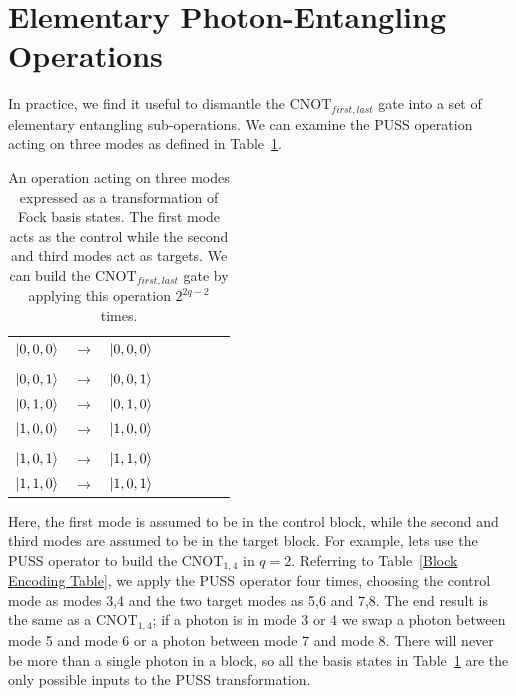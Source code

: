 \documentclass[aps,pra,twocolumn,showpacs,superscriptaddress,floatfix,10pt]{revtex4}
\begin{document}
\section{Elementary Photon-Entangling Operations}
\label{Section Elementary Photon Entangling Operations}

 In practice, we find it useful to dismantle the $\mbox{CNOT}_{first,last}$ gate into a set of elementary entangling sub-operations. We can examine the PUSS operation acting on three modes as defined in Table~\ref{One Control Two Targets}. 
\begin {table}[h]
\begin{center}
	\begin{tabular}{l*{6}{c}r} 
		$\ket{0,0,0}$  &  $\rightarrow$ & $\ket{0,0,0}$ \\ \\
		$\ket{0,0,1}$  & $\rightarrow$ & $\ket{0,0,1}$ \\
		$\ket{0,1,0}$ & $\rightarrow$ & $\ket{0,1,0}$ \\
		$\ket{1,0,0}$ & $\rightarrow$ & $\ket{1,0,0} $ \\ \\
		$\ket{1,0,1}$ & $\rightarrow$ & $\ket{1,1,0}$ \\
		$\ket{1,1,0}$ & $\rightarrow$ & $\ket{1,0,1}$ \\
	\end{tabular}
	\caption{ \label{One Control Two Targets} An operation acting on three modes expressed as a transformation of Fock basis states. The first mode acts as the control while the second and third modes act as targets. We can build the $\mbox{CNOT}_{first,last}$ gate by applying this operation $2^{2 q -2}$ times.}
\end{center}
\end{table}
Here, the first mode is assumed to be in the control block, while the second and third modes are assumed to be in the target block. For example, lets use the PUSS operator to build the $\mbox{CNOT}_{1,4}$ in $q=2$. Referring to Table~\ref{Block Encoding Table}, we apply the PUSS operator four times, choosing the control mode as modes 3,4 and the two target modes as 5,6 and 7,8. The end result is the same as a $\mbox{CNOT}_{1,4}$; if a photon is in mode 3 or 4 we swap a photon between mode 5 and mode 6 or a photon between mode 7 and mode 8. There will never be more than a single photon in a block, so all the basis states in Table~\ref{One Control Two Targets} are the only possible inputs to the PUSS transformation.
\end{document}
